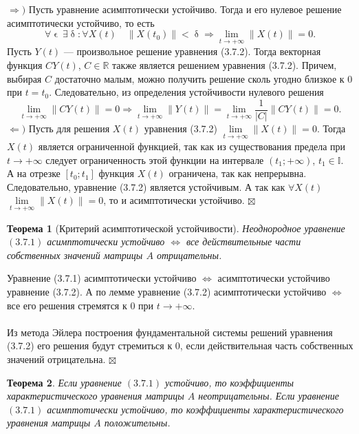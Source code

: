 \documentclass[a4paper, 12pt]{report}
\newenvironment{Proof} %
{\par\noindent{$\blacklozenge$}} %
{\hfill$\scriptstyle\boxtimes$}
\newcommand{\Rm}{\mathbb{R}}
\newcommand{\I}{\mathbb{I}}
\renewcommand{\delta}{\updelta}
\renewcommand{\epsilon}{\upvarepsilon}
\newcommand\Norm[1]{\left\| #1 \right\|}
\newtheorem*{theorem}{Теорема}
\begin{document}
\begin{Proof}
	$\Rightarrow)$ Пусть уравнение асимптотически устойчиво. Тогда и его нулевое решение асимптотически устойчиво, то есть $$\forall \epsilon\ \exists \delta : \forall X(t) \quad \Norm{X(t_0)} < \delta \Rightarrow \lim\limits_{t\to +\infty} \Norm{X(t)} = 0.$$
	Пусть $Y(t)$ --- произвольное решение уравнения (3.7.2). Тогда векторная функция $CY(t)$, $C \in \Rm$ также является решением уравнения (3.7.2). Причем, выбирая $C$ достаточно малым, можно получить решение сколь угодно близкое к 0 при $t = t_0$. Следовательно, из определения устойчивости нулевого решения $$\lim\limits_{t\to +\infty} \Norm{CY(t)} = 0 \Rightarrow \lim\limits_{t\to +\infty} \Norm{Y(t)} = \lim\limits_{t\to +\infty} \dfrac{1}{|C|}\Norm{CY(t)} =0 .$$
	$\Leftarrow)$ Пусть для решения $X(t)$ уравнения (3.7.2) $\lim\limits_{t\to +\infty} \Norm{X(t)} = 0$. Тогда $X(t)$ является ограниченной функцией, так как из существования предела при $t\to +\infty$ следует ограниченность этой функции на интервале $(t_1; +\infty)$, $t_1 \in \I$. А на отрезке $[t_0; t_1]$ функция $X(t)$ ограничена, так как непрерывна. Следовательно, уравнение (3.7.2) является устойчивым. А так как $\forall X(t)$ $\lim\limits_{t\to +\infty} \Norm{X(t)} = 0$, то и асимптотически устойчиво.
\end{Proof}
\begin{theorem}
	[Критерий асимптотической устойчивости]
	Неоднородное уравнение $(3.7.1)$ асимптотически устойчиво $\Longleftrightarrow$ все действительные части собственных значений матрицы $A$ отрицательны.
\end{theorem}
\begin{Proof}
	Уравнение (3.7.1) асимптотически устойчиво $\Longleftrightarrow$ асимптотически устойчиво уравнение (3.7.2). А по лемме уравнение (3.7.2) асимптотически устойчиво $\Longleftrightarrow$ все его решения стремятся к 0 при $t\to+\infty$.\\\\
	Из метода Эйлера построения фундаментальной системы решений уравнения (3.7.2) его решения будут стремиться к 0, если действительная часть собственных значений отрицательна.
\end{Proof}
\begin{theorem}
	Если уравнение $(3.7.1)$ устойчиво, то коэффициенты характеристического уравнения матрицы $A$ неотрицательны. Если уравнение $(3.7.1)$ асимптотически устойчиво, то коэффициенты характеристического уравнения матрицы $A$ положительны.
\end{theorem}
\end{document}
